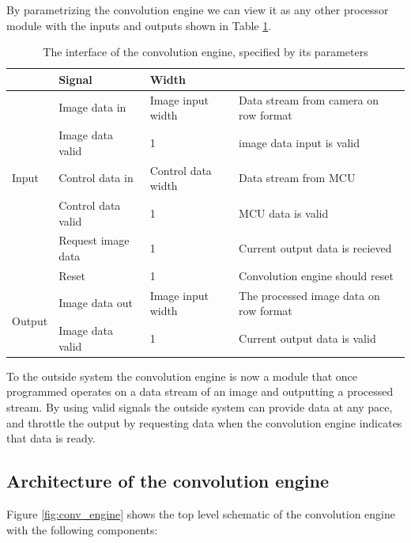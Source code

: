 By parametrizing the convolution engine we can view it as any other processor module with the inputs and outputs shown in Table \ref{tbl:ConvolutionEngineIO}.

\begin{table}[h]
    \begin{tabular}{l | l | l | l }
        &   Signal & Width\\
        \hline
        \multirow{5}{*}{Input}
        &   Image data in           & Image input width     & Data stream from camera on row format
        \\
        &   Image data valid        & 1                     & image data input is valid
        \\
        &   Control data in         & Control data width    & Data stream from MCU
        \\
        &   Control data valid      & 1                     & MCU data is valid
        \\
        &   Request image data      & 1                     & Current output data is recieved
        \\
        &   Reset                   & 1                     & Convolution engine should reset
        \\\hline
        \multirow{2}{*}{Output}
        &   Image data out          & Image input width     & The processed image data on row format\\
        &   Image data valid        & 1                     & Current output data is valid
    \end{tabular}
    \caption{The interface of the convolution engine, specified by its parameters}
    \label{tbl:ConvolutionEngineIO}
\end{table}

To the outside system the convolution engine is now a module that once programmed operates on a data stream of an image and outputting a processed stream. 
By using valid signals the outside system can provide data at any pace, and throttle the output by requesting data when the convolution engine indicates that data is ready. 

\subsection{Architecture of the convolution engine}

Figure \ref{fig:conv_engine} shows the top level schematic of the convolution engine with the following components:

